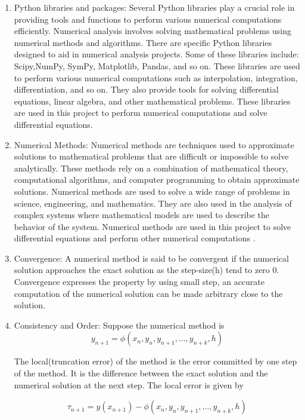 \begin{enumerate}
    \item Python libraries and packages: Several Python libraries play a crucial role in providing tools and functions to perform various numerical computations efficiently. Numerical analysis involves solving mathematical problems using numerical methods and algorithms. There are specific Python libraries designed to aid in numerical analysis projects. Some of these libraries include: Scipy,NumPy, SymPy, Matplotlib, Pandas, and so on. These libraries are used to perform various numerical computations such as interpolation, integration, differentiation, and so on. They also provide tools for solving differential equations, linear algebra, and other mathematical problems. These libraries are used in this project to perform numerical computations and solve differential equations.
    \item Numerical Methods: Numerical methods are techniques used to approximate solutions to mathematical problems that are difficult or impossible to solve analytically. These methods rely on a combination of mathematical theory, computational algorithms, and computer programming to obtain approximate solutions. Numerical methods are used to solve a wide range of problems in science, engineering, and mathematics. They are also used in the analysis of complex systems where mathematical models are used to describe the behavior of the system. Numerical methods are used in this project to solve differential equations and perform other numerical computations \cite{isibor-2020}.
    \item Convergence: A numerical method is said to be convergent if the numerical solution approaches the exact solution as the step-size(h) tend to zero $0$. Convergence expresses the property by using small step, an accurate computation of the numerical solution can be made arbitrary close to the solution.
    


    \item Consistency and Order: Suppose the numerical method is 
    \begin{equation}
        y_{n+1} = \phi(x_{n},y_{n},y_{n+1},\dots,y_{n+k},h)
    \end{equation}

    The local(truncation error) of the method is the error committed by one step of the method. It is the difference between the exact solution and the numerical solution at the next step. The local error is given by

    \begin{equation}
        \tau_{n+1} = y(x_{n+1}) - \phi(x_{n},y_{n},y_{n+1},\dots,y_{n+k},h)
    \end{equation}


\end{enumerate}
